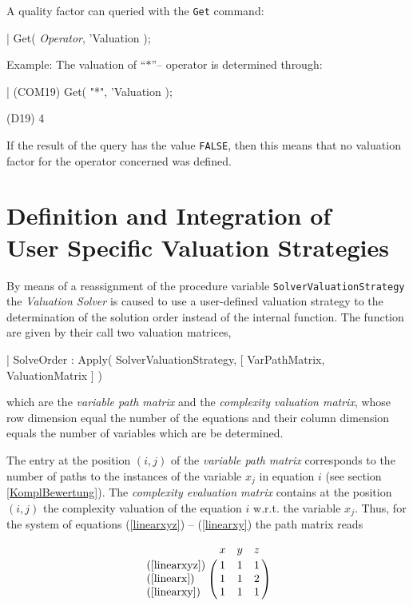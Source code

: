 A quality factor can queried with the \verb+Get+ command:
\begin{literatim}{|}
     Get( {\em{}Operator}, 'Valuation );
\end{literatim}
Example: The valuation of ``$*$''-- operator is determined through:

\begin{literatim}{|}
(COM19) Get( "{}*"{}, 'Valuation );

(D19)                                   4
\end{literatim}

If the result of the query has  the value \verb+FALSE+,  then this means that no valuation factor for the operator concerned was defined.




\section[User Specific Valuation Strategie]%
{Definition and Integration of \\User Specific Valuation Strategies%
\label{SolverValuationStrategies}}

By means of a reassignment of the procedure variable \verb+SolverValuationStrategy+ the {\em Valuation Solver} is caused to use  a user-defined valuation strategy to the determination of the solution order instead of the internal function. The function are given by their call 
two valuation matrices,
\begin{literatim}{|}
     SolveOrder : Apply(
       SolverValuationStrategy, [ VarPathMatrix, ValuationMatrix ]
     )
\end{literatim}
which are the  {\em variable path matrix} and the {\em complexity valuation matrix}, whose row dimension equal the number of the equations and their column dimension equals the number of variables which are be determined.

The entry at the position $(i,j)$ of the {\em variable path matrix} corresponds to the number of paths to the instances of the variable $x_j$ in equation  $i$ (see section \ref{KomplBewertung}). The {\em complexity evaluation matrix} contains at the position $(i,j)$ the complexity valuation of the equation $i$
w.r.t. the variable $x_j$. Thus, for the system of equations (\ref{linearxyz}) -- (\ref{linearxy})
the path matrix reads 

$$
\bordermatrix{
                  & x & y & z \cr
(\ref{linearxyz}) & 1 & 1 & 1 \cr 
(\ref{linearx})  & 1 & 1 & 2 \cr 
(\ref{linearxy}) & 1 & 1 & 1 \cr 
}
$$

